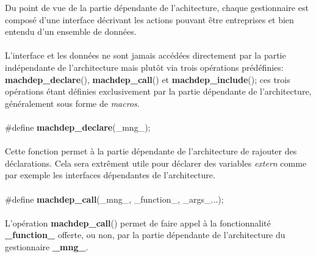 \documentclass[10pt,a4wide]{article}
\begin{document}
Du point de vue de la partie d\'ependante de l'achitecture, chaque
gestionnaire est compos\'e d'une interface d\'ecrivant les actions
pouvant \^etre entreprises et bien entendu d'un ensemble de donn\'ees.

\paragraph{}

L'interface et les donn\'ees ne sont jamais acc\'ed\'ees directement
par la partie ind\'ependante de l'architecture mais plut\^ot via
trois op\'erations pr\'ed\'efinies: \textbf{machdep\_declare}(),
\textbf{machdep\_call}() et \textbf{machdep\_include}(); ces trois op\'erations
\'etant d\'efinies exclusivement par la partie d\'ependante de l'architecture,
g\'en\'eralement sous forme de \textit{macros}.

\paragraph{}

\hspace{1.5cm}\#define \textbf{machdep\_declare}(\_mng\_);

\paragraph{}

Cette fonction permet \`a la partie d\'ependante de l'architecture de rajouter
des d\'eclarations. Cela sera extr\^ement utile pour d\'eclarer des variables
\textit{extern} comme par exemple les interfaces d\'ependantes de l'architecture.

\paragraph{}

\hspace{1.5cm}\#define \textbf{machdep\_call}(\_mng\_,
                                              \_function\_,
                                              \_args\_...);

\paragraph{}

L'op\'eration \textbf{machdep\_call}() permet de faire appel \`a la
fonctionnalit\'e \textbf{\_function\_} offerte, ou non, par
la partie d\'ependante de l'architecture du gestionnaire
\textbf{\_mng\_}.
\end{document}
